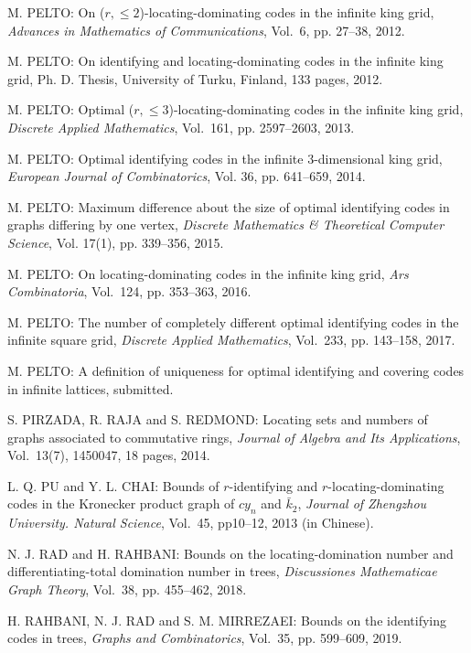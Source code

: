 \begin{thebibliography}{999}
M. PELTO: On ($r, \leq 2$)-locating-dominating codes in the infinite king grid, {\it Advances in Mathematics of Communications}, Vol.~6, pp. 27--38, 2012.

M. PELTO: On identifying and locating-dominating codes in the infinite king grid, Ph. D. Thesis, University of Turku, Finland, 133 pages, 2012.

M. PELTO: Optimal ($r, \leq 3$)-locating-dominating codes in the infinite king grid, {\it Discrete Applied Mathematics}, Vol.~161, pp. 2597--2603, 2013.

M. PELTO: Optimal identifying codes in the infinite $3$-dimensional king grid, {\it European Journal of Combinatorics}, Vol. 36, pp. 641--659, 2014.

M. PELTO: Maximum difference about the size of optimal identifying codes in graphs differing by one vertex, {\it Discrete Mathematics \& Theoretical Computer Science}, Vol. 17(1), pp. 339--356, 2015.

M. PELTO: On locating-dominating codes in the infinite king grid, {\it Ars Combinatoria}, Vol.~124, pp. 353--363, 2016.

M. PELTO: The number of completely different optimal identifying codes in the infinite square grid, {\it Discrete Applied Mathematics}, Vol.~233, pp. 143--158,  2017.

M. PELTO: A definition of uniqueness for optimal identifying and covering codes in infinite lattices, submitted.

S. PIRZADA, R. RAJA and S. REDMOND: Locating sets and numbers of graphs associated to commutative rings, {\it Journal of Algebra and Its Applications}, Vol.~13(7), 1450047, 18 pages, 2014.

L. Q. PU and Y. L. CHAI: Bounds of $r$-identifying and $r$-locating-dominating codes in the Kronecker product graph of $cy_n$ and $\bar{k}_2$, {\it Journal of Zhengzhou University. Natural Science}, Vol.~45, pp10--12, 2013 (in Chinese).

N. J. RAD and H. RAHBANI: Bounds on the locating-domination number and differentiating-total domination number in trees, {\it Discussiones Mathematicae Graph Theory}, Vol.~38, pp. 455--462, 2018.

H. RAHBANI, N. J. RAD and S. M. MIRREZAEI: Bounds on the identifying codes in trees, {\it Graphs and Combinatorics}, Vol.~35, pp. 599--609, 2019.


\end{thebibliography}
